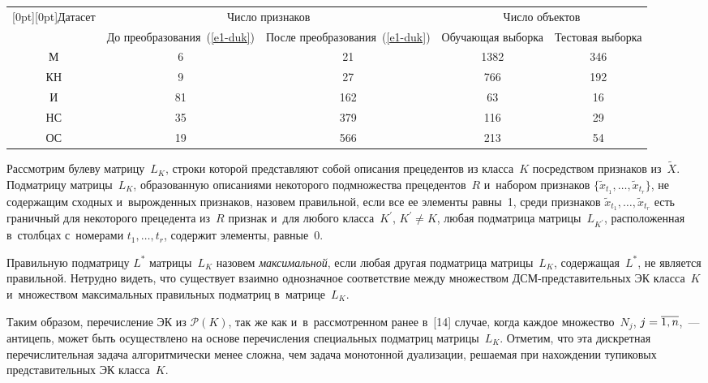 \begin{multicols}{2}
\begin{table*}[b]\small %
\vspace*{-15pt}
\begin{center}
\vspace*{2ex}

\begin{tabular}{|c|c|c|c|c|}
\hline
\multicolumn{1}{|c|}{\raisebox{-6pt}[0pt][0pt]{Датасет}}&\multicolumn{2}{c|}{Число признаков}&\multicolumn{2}{c|}{Число объектов}\\
\cline{2-5}
&До 
преобразования~(\ref{e1-duk})&После преобразования~(\ref{e1-duk})&Обучающая
выборка&Тестовая 
выборка\\
\hline
М&\hphantom{9}6&\hphantom{9}21&1382\hphantom{9}&346\hphantom{9}\\
КН&\hphantom{9}9&\hphantom{9}27&766&192\hphantom{9}\\
И&81&162&\hphantom{9}63&16\\
НС&35&379&116&29\\
ОС&19&566&213&54\\
\hline
\end{tabular}
\end{center}
\end{table*}

    
    Рассмотрим булеву матрицу~$L_K$, строки которой представляют собой 
описания прецедентов из класса~$K$ посредством признаков из~$\tilde{X}$. 
Под\-мат\-ри\-цу мат\-ри\-цы~$L_K$, образованную описаниями некоторого 
подмножества прецедентов~$R$ и~набором признаков $\{ \tilde{x}_{t_1},\ldots , 
\tilde{x}_{t_r}\}$, не содержащим сходных и~вырожденных признаков, назовем 
правильной, если все ее элементы равны~1, среди признаков $ 
\tilde{x}_{t_1},\ldots , \tilde{x}_{t_r}$ есть граничный для некоторого 
прецедента из~$R$ признак и~для любого класса~$K^\prime$, $K^\prime\not= 
K$, любая подматрица матрицы~$L_{K^\prime}$, расположенная в~столбцах 
с~номерами $t_1,\ldots , t_r$, содержит элементы, равные~0. 
  
  Правильную подматрицу $L^*$ матрицы~$L_K$ назовем 
\textit{максимальной}, если любая другая под\-мат\-рица мат\-ри\-цы~$L_K$, 
содержащая~$L^*$, не является правильной. Нетрудно видеть, что существует 
взаимно \mbox{однозначное} соответствие между множеством 
 ДСМ-пред\-ста\-ви\-тель\-ных ЭК класса~$K$ и~множеством максимальных 
правильных под\-мат\-риц в~мат\-ри\-це~$L_K$. 
  
  Таким образом, перечисление ЭК из $\mathcal{P}(K)$, так же как 
и~в~рассмотренном ранее в~[14] случае, когда каждое множество~$N_j$, 
$j\hm= \overline{1, n}$,~--- антицепь, может быть осуществлено на основе 
перечисления специальных подматриц матрицы~$L_K$. Отметим, что эта 
дискретная перечислительная задача алгоритмически менее сложна, чем задача 
монотонной дуализации, решаемая при нахождении тупиковых 
представительных ЭК класса~$K$. 
  

\end{multicols}
